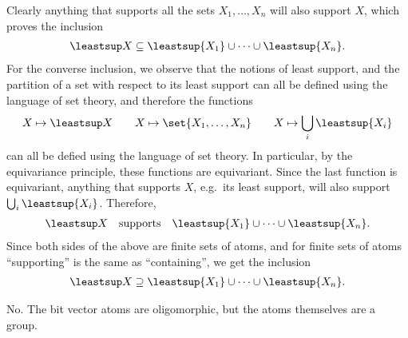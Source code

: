 {Clearly anything that supports all the sets $X_1,\ldots,X_n$ will also support $X$, which proves the inclusion
\begin{align*}
 \leastsup X \subseteq \leastsup{X_1} \cup \cdots \cup \leastsup {X_n}.
 \end{align*}
 For the converse inclusion, we observe that the notions of least support, and the partition of a set with respect to its least support can all be defined using the language of set theory, and therefore the functions
\begin{align*}
 X \mapsto \leastsup X \qquad X \mapsto \set{X_1,\ldots,X_n} \qquad X \mapsto \bigcup_{i} \leastsup {X_i}
\end{align*}
can all be defied using the language of set theory. In particular, by the equivariance principle, these functions are equivariant. Since the last function is equivariant, anything that supports $X$, e.g.~its least support, will also support $\bigcup_i \leastsup{X_i}$. Therefore, 
\begin{align*}
 \leastsup X \quad \text{supports} \quad \leastsup{X_1} \cup \cdots \cup \leastsup {X_n}.
 \end{align*}
Since both sides of the above are finite sets of atoms, and for finite sets of atoms ``supporting'' is the same as ``containing'', we get the inclusion
\begin{align*}
 \leastsup X \supseteq \leastsup{X_1} \cup \cdots \cup \leastsup {X_n}.
 \end{align*}

}


 {No. The bit vector atoms are oligomorphic, but the atoms themselves are a group.}



